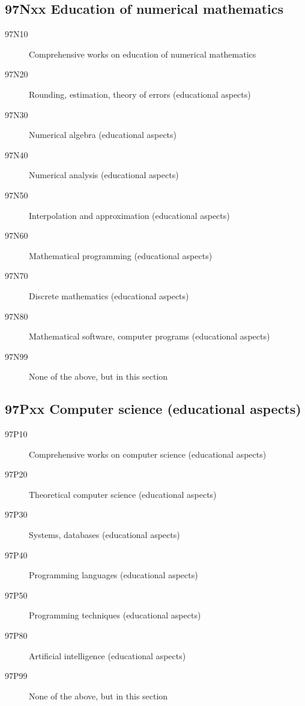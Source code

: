 \documentclass[letterpaper]{article}
\begin{document}
\subsection*{97Nxx  Education of numerical mathematics }\label{97Nxx}
\begin{description}  
\item [97N10]\label{97N10} Comprehensive works on education of numerical mathematics
\item [97N20]\label{97N20} Rounding, estimation, theory of errors (educational aspects)
\item [97N30]\label{97N30} Numerical algebra (educational aspects)
\item [97N40]\label{97N40} Numerical analysis (educational aspects)
\item [97N50]\label{97N50} Interpolation and approximation (educational aspects)
\item [97N60]\label{97N60} Mathematical programming (educational aspects)
\item [97N70]\label{97N70} Discrete mathematics (educational aspects)
\item [97N80]\label{97N80} Mathematical software, computer programs (educational aspects)
\item [97N99]\label{97N99} None of the above, but in this section
\end{description}
\subsection*{97Pxx  Computer science (educational aspects) }\label{97Pxx}
\begin{description}  
\item [97P10]\label{97P10} Comprehensive works on computer science (educational aspects)
\item [97P20]\label{97P20} Theoretical computer science (educational aspects)
\item [97P30]\label{97P30} Systems, databases (educational aspects)
\item [97P40]\label{97P40} Programming languages (educational aspects)
\item [97P50]\label{97P50} Programming techniques (educational aspects)
\item [97P80]\label{97P80} Artificial intelligence (educational aspects)
\item [97P99]\label{97P99} None of the above, but in this section
\end{description}
\end{document}

